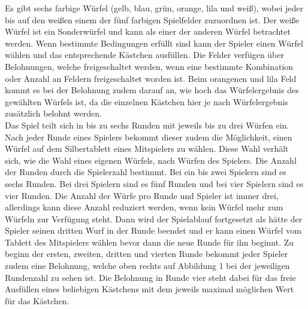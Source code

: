 Es gibt sechs farbige Würfel (gelb, blau, grün, orange, lila und weiß), wobei jeder bis auf den weißen einem der fünf farbigen Spielfelder zuzuordnen ist. Der weiße Würfel ist ein Sonderwürfel und kann als einer der anderen Würfel betrachtet werden. Wenn bestimmte Bedingungen erfüllt sind kann der Spieler einen Würfel wählen und das entsprechende Kästchen ausfüllen. Die Felder verfügen über Belohnungen, welche freigeschaltet werden, wenn eine bestimmte Kombination oder Anzahl an Feldern freigeschaltet worden ist. Beim orangenen und lila Feld kommt es bei der Belohnung zudem darauf an, wie hoch das Würfelergebnis des gewählten Würfels ist, da die einzelnen Kästchen hier je nach Würfelergebnis zusätzlich belohnt werden.
\\
Das Spiel teilt sich in bis zu sechs Runden mit jeweils bis zu drei Würfen ein. Nach jeder Runde eines Spielers bekommt dieser zudem die Möglichkeit, einen Würfel auf dem Silbertablett eines Mitspielers zu wählen. Diese Wahl verhält sich, wie die Wahl eines eigenen Würfels, nach Würfen des Spielers. Die Anzahl der Runden durch die Spielerzahl bestimmt. Bei ein bis zwei Spielern sind es sechs Runden. Bei drei Spielern sind es fünf Runden und bei vier Spielern sind es vier Runden. Die Anzahl der Würfe pro Runde und Spieler ist immer drei, allerdings kann diese Anzahl reduziert werden, wenn kein Würfel mehr zum Würfeln zur Verfügung steht. Dann wird der Spielablauf fortgesetzt als hätte der Spieler seinen dritten Wurf in der Runde beendet und er kann einen Würfel vom Tablett des Mitspielers wählen bevor dann die neue Runde für ihn beginnt. Zu beginn der ersten, zweiten, dritten und vierten Runde bekommt jeder Spieler zudem eine Belohnung, welche oben rechts auf Abbildung 1 bei der jeweiligen Rundenzahl zu sehen ist. Die Belohnung in Runde vier steht dabei für das freie Ausfüllen eines beliebigen Kästchens mit dem jeweils maximal möglichen Wert für das Kästchen.


